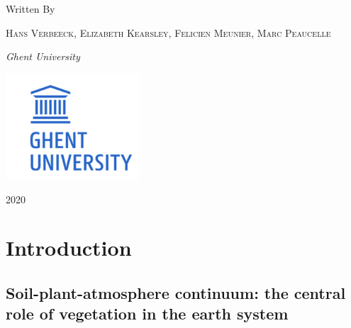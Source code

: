\documentclass[oneside]{book}
\begin{document}
\begin{titlepage}
	Written By
	
	\vspace{0.5\baselineskip} %
	
	{\scshape Hans Verbeeck, Elizabeth Kearsley, Felicien Meunier, Marc Peaucelle \\} %
	
	\vspace{0.5\baselineskip} %
	
	\textit{Ghent University \\} %
	
	\vfill %
	
	
	
	\includegraphics[width = 50mm]{figures/UGhent2.png}
	
	\vspace{0.3\baselineskip} %
	
	2020 %
	

\end{titlepage}

{
\setcounter{tocdepth}{1}
\tableofcontents
}
\mainmatter

\chapter{Introduction}\label{intro}

\section{Soil-plant-atmosphere continuum: the central role of vegetation
in the earth
system}\label{soil-plant-atmosphere-continuum-the-central-role-of-vegetation-in-the-earth-system}
\end{document}
